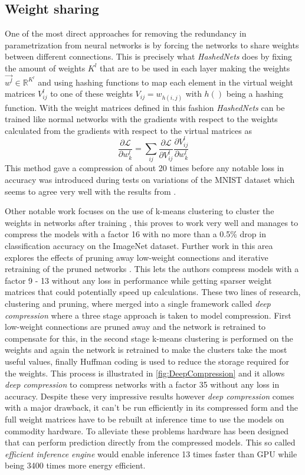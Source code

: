 \documentclass{kththesis}
\newcommand{\bibentry}[1]{\parencite{#1}}
\begin{document}
\subsection{Weight sharing}
One of the most direct approaches for removing the redundancy in parametrization
from neural networks is by forcing the networks to share weights between
different connections. This is precisely what \emph{HashedNets}
\bibentry{chen2015compressing} does by fixing the amount of weights \(K^l\) that
are to be used in each layer making the weights \(\vec{w^l} \in
\mathbb{R}^{K^l}\) and using hashing functions to map each element in the
virtual weight matrices \(V_{ij}^l\) to one of these weights \(V_{ij} =
w_{h(i,j)}\) with \(h()\) being a hashing function. With the weight matrices
defined in this fashion \emph{HashedNets} can be trained like normal networks
with the gradients with respect to the weights calculated from the gradients
with respect to the virtual matrices as  
\[ \frac{\partial\mathcal{L}}{\partial w_k^l} = \sum_{ij} \frac{\partial\mathcal{L}}{\partial V_{ij}^l}\frac{\partial V_{ij}^l}{\partial w_k^l} \]
This method gave a compression of about 20 times before any notable loss in
accuracy was introduced during tests on variations of the MNIST dataset which
seems to agree very well with the results from \bibentry{denil2013predicting}. 

Other notable work focuses on the use of k-means clustering to cluster the
weights in networks after training \bibentry{gong2014compressing}, this proves
to work very well and manages to compress the models with a factor 16 with no
more than a 0.5\% drop in classification accuracy on the ImageNet dataset.
Further work in this area explores the effects of pruning away low-weight
connections and iterative retraining of the pruned networks
\bibentry{han2015learning}. This lets the authors compress models with a factor
9 - 13 without any loss in performance while getting sparser weight matrices
that could potentially speed up calculations. These two lines of research,
clustering and pruning, where merged into a single framework called \emph{deep
  compression} \bibentry{han2015deep} where a three stage approach is taken to
model compression. First low-weight connections are pruned away and the network
is retrained to compensate for this, in the second stage k-means clustering is
performed on the weights and again the network is retrained to make the clusters
take the most useful values, finally Huffman coding
\bibentry{van1976construction} is used to reduce the storage required for the
weights. This process is illustrated in \cref{fig:DeepCompression} and it allows \emph{deep compression} to compress networks with a
factor 35 without any loss in accuracy. Despite these very impressive results
however \emph{deep compression} comes with a major drawback, it can't be run
efficiently in its compressed form and the full weight matrices have to be
rebuilt at inference time to use the models on commodity hardware. To alleviate
these problems hardware has been designed that can perform prediction directly
from the compressed models. This so called \emph{efficient inference engine}
\bibentry{han2016eie} would enable inference 13 times faster than GPU while
being 3400 times more energy efficient.  
\end{document}
